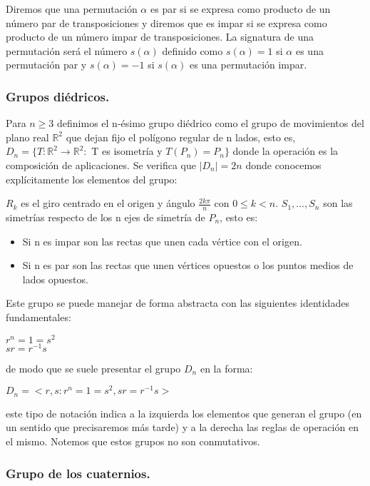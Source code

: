 \begin{ndef}
Diremos que una permutación $\alpha$ es par si se expresa como producto de un número par de transposiciones y diremos que es impar si se expresa como producto de un número impar de transposiciones. La signatura de una permutación será el número $s(\alpha)$ definido como $s(\alpha) = 1$ si $\alpha$ es una permutación par y $s(\alpha) = -1$ si $s(\alpha)$ es una permutación impar.
\end{ndef}

\subsubsection{Grupos diédricos.}

Para $n \ge 3$ definimos el n-ésimo grupo diédrico como el grupo de movimientos del plano real $\mathbb{R}^2$ que dejan fijo el polígono regular de n lados, esto es, $D_n = \{T:\mathbb{R}^2 \rightarrow \mathbb{R}^2 :$ T es isometría  y  $T(P_n) = P_n\}$ donde la operación es la composición de aplicaciones. Se verifica que $|D_n| = 2n$ donde conocemos explícitamente los elementos del grupo:

$R_k$ es el giro centrado en el origen y ángulo $\frac{2k\pi}{n}$ con $0 \le k < n$.
$S_1,...,S_n$ son las simetrías respecto de los n ejes de simetría de $P_n$, esto es:
\begin{itemize}
\item Si n es impar son las rectas que unen cada vértice con el origen.
\item Si n es par son las rectas que unen vértices opuestos o los puntos medios de lados opuestos.
\end{itemize}
  
Este grupo se puede manejar de forma abstracta con las siguientes identidades fundamentales:

$r^n = 1 = s^2$\\
$sr = r^{-1}s$

de modo que se suele presentar el grupo $D_n$ en la forma:

$D_n = <r,s : r^n = 1 = s^2,sr = r^{-1}s>$

este tipo de notación indica a la izquierda los elementos que generan el grupo (en un sentido que precisaremos más tarde) y a la derecha las reglas de operación en el mismo. Notemos que estos grupos no son conmutativos.

\subsubsection{Grupo de los cuaternios.}

